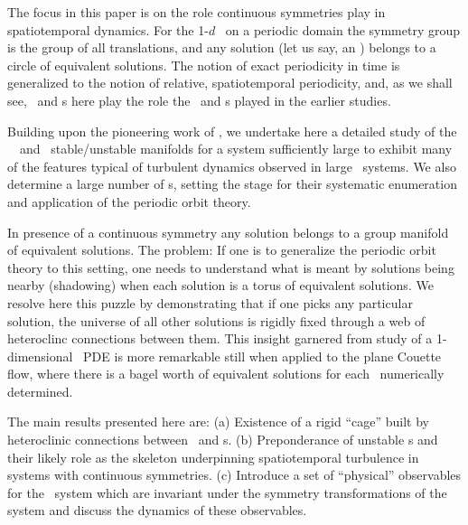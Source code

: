 The focus in this paper is on the role continuous symmetries
play in spatiotemporal dynamics. For the 1-$d$ \KS\ on a periodic domain
the symmetry group is the group of all translations, and
any solution (let us say, an \eqv ) belongs to a circle of equivalent
solutions. The notion of exact periodicity in time is 
generalized to the notion of relative, spatiotemporal periodicity, and,
as we shall see, 
\reqva\ and \rpo s here play the role the \eqva\ and
\po s played in the earlier studies. 

Building upon the pioneering work of
, we undertake here a detailed study of the 
\KS\ \eqva\ and \reqva\ stable/unstable manifolds
for a system sufficiently large to exhibit many of
the features typical of turbulent dynamics observed in large \KS\ systems.
We also determine a large number of \rpo s, setting the
stage for their systematic enumeration and application 
of the periodic orbit theory.

In presence of a continuous symmetry any solution belongs to a 
group manifold of equivalent solutions. The problem: If one is to generalize
the periodic orbit theory to this setting, one needs to understand what
is meant by solutions being nearby (shadowing) when each solution is
a torus of equivalent solutions. 
We resolve here this puzzle by demonstrating that if one picks
any particular solution, the universe of all other solutions is
rigidly fixed through a web of heteroclinc connections between them.
This insight garnered from study of a
1-dimensional \KS\ PDE is more remarkable still when applied to
the plane Couette flow, where there
is a bagel worth of equivalent solutions for each \eqv\ numerically determined.


The main results presented here are:
(a) Existence of a rigid ``cage'' built by heteroclinic connections
between \eqva\ and \po s.
(b) Preponderance of unstable \rpo s and their likely
role as the skeleton underpinning spatiotemporal turbulence in
systems with continuous symmetries. 
(c) Introduce a set of ``physical'' observables for the \KS\ system 
which are invariant under the symmetry transformations of the system
and discuss the dynamics of these observables. 



